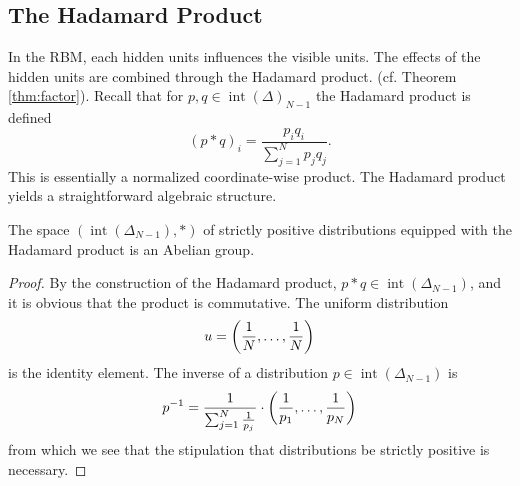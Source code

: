 \documentclass[11pt,titlepage]{article}
\DeclareMathOperator{\intr}{int}
\numberwithin{equation}{section}
\begin{document}
\subsection{The Hadamard Product}

    In the RBM, each hidden units influences the visible units.  The effects of
    the hidden units are combined through the Hadamard product.  (cf. Theorem
    \ref{thm:factor}).  Recall that for $p, q \in \intr(\Delta)_{N-1}$ the
    Hadamard product is defined
    \[
        (p * q)_i = \frac{p_i q_i}{\sum_{j=1}^N p_j q_j}.
    \]
    This is essentially a normalized coordinate-wise product.  The Hadamard
    product yields a straightforward algebraic structure.

    \begin{theorem}
    The space $(\intr(\Delta_{N-1}), *)$ of strictly positive distributions
    equipped with the Hadamard product is an Abelian group.
    \end{theorem}
    \begin{proof}
    By the construction of the Hadamard product, $p * q \in
    \intr(\Delta_{N-1})$, and it is obvious that the product is commutative.
    The uniform distribution
    \[
        u = \pdil*{\frac 1 N, \ldots, \frac 1 N}
    \]
    is the identity element.  The inverse of a distribution $p \in
    \intr(\Delta_{N-1})$ is 
    \[
        \inv p = \frac{1}{\sum_{j=1}^N \frac 1 {p_j}}
        \cdot\pdil*{\frac 1 {p_1}, \ldots, \frac 1 {p_N}}
    \]
    from which we see that the stipulation that distributions be strictly
    positive is necessary.
    \end{proof}
\end{document}
